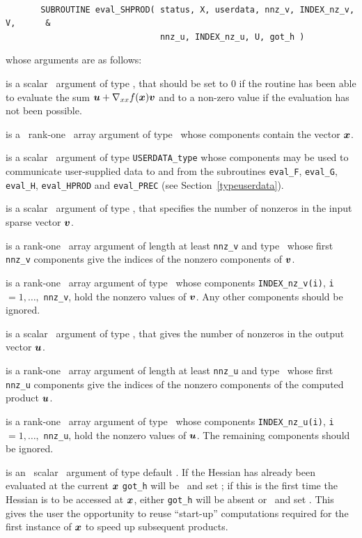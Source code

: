 \documentclass{galahad}
\begin{document}
\def\baselinestretch{0.8}
{\tt
\begin{verbatim}
       SUBROUTINE eval_SHPROD( status, X, userdata, nnz_v, INDEX_nz_v, V,      &
                               nnz_u, INDEX_nz_u, U, got_h )
\end{verbatim} }
\def\baselinestretch{1.0}
\noindent whose arguments are as follows:

\begin{description}
 is a scalar \intentout\ argument of type \integer,
that should be set to 0 if the routine has been able to evaluate the
sum ${\bm{u}} + \nabla_{xx} f({\bm{x}}) {\bm{v}}$
and to a non-zero value if the evaluation has not been possible.

 is a \ rank-one \intentin\ array argument of type
\realdp\ whose components contain the vector ${\bm{x}}$.

 is a scalar \intentinout\ argument of type
{\tt USERDATA\_type} whose components may be used
to communicate user-supplied data to and from the
subroutines {\tt eval\_F}, {\tt eval\_G},
{\tt eval\_H}, {\tt eval\_HPROD} and {\tt eval\_PREC}
(see Section~\ref{typeuserdata}).

 is a scalar \intentin\ argument of type \integer,
that specifies the number of nonzeros in the input sparse vector
${\bm{v}}$.

 is a rank-one \intentin\ array argument of length 
at least {\tt nnz\_v} and type \integer\ 
whose first {\tt nnz\_v} components 
give the indices of the nonzero components of ${\bm{v}}$.

 is a rank-one \intentin\ array argument of type \realdp\
whose components {\tt INDEX\_nz\_v(i)}, {\tt i} $= 1, \ldots,$ {\tt nnz\_v},
hold the nonzero values of ${\bm{v}}$. Any other components should be ignored.

\itt{nnz\_u} is a scalar \intentout\ argument of type \integer,
that gives the number of nonzeros in the output vector ${\bm{u}}$.

 is a rank-one \intentout\ array argument of length 
at least {\tt nnz\_u} and type \integer\ 
whose first {\tt nnz\_u} components give the indices of the 
nonzero components of the computed product ${\bm{u}}$.

\ittf{U} is a rank-one \intentout\ array argument of type \realdp\
whose components {\tt INDEX\_nz\_u(i)}, {\tt i} $= 1, \ldots,$ {\tt nnz\_u},
hold the nonzero values of ${\bm{u}}$. The remaining components should be ignored.

\ittf{got\_h} is an \optional\ scalar \intentin\ argument of type default
\logical. If the Hessian has already been evaluated at the current ${\bm{x}}$
{\tt got\_h} will be \present\ and set \true; if this is the first time
the Hessian is to be accessed at ${\bm{x}}$, either {\tt got\_h} will be absent
or \present\ and set \false. This gives the user the opportunity
to reuse ``start-up'' computations required for the first instance of
${\bm{x}}$ to speed up subsequent products.

\end{description}
\end{document}
